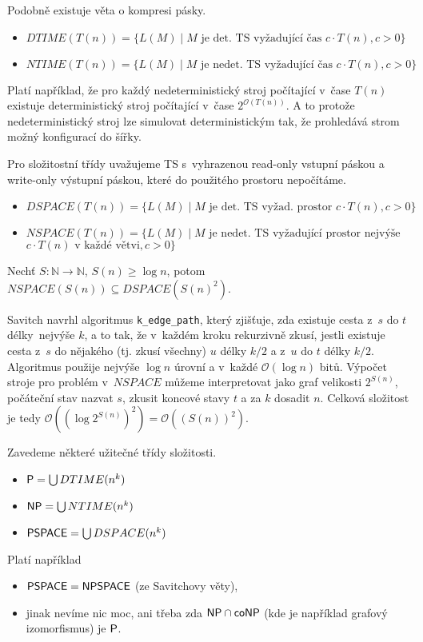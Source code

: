 Podobně existuje věta o kompresi pásky.

\begin{itemize}
    \item $DTIME(T(n)) = \{ L(M) \mid \text{$M$ je det. TS vyžadující
        čas $c \cdot T(n)$}, c > 0 \}$
    \item $NTIME(T(n)) = \{ L(M) \mid \text{$M$ je nedet. TS vyžadující
    čas } c \cdot T(n), c > 0 \}$
\end{itemize}

Platí například, že pro každý nedeterministický stroj počítající v~čase
$T(n)$ existuje deterministický stroj počítající v~čase
$2^{\mathcal{O}(T(n))}$. A to protože nedeterministický stroj lze
simulovat deterministickým tak, že prohledává strom možný konfigurací do
šířky.

Pro složitostní třídy uvažujeme TS s~vyhrazenou read-only vstupní páskou
a write-only výstupní páskou, které do použitého prostoru nepočítáme.

\begin{itemize}
    \item $DSPACE(T(n)) = \{ L(M) \mid \text{$M$ je det. TS vyžad.
        prostor } c \cdot T(n), c > 0 \}$
    \item $NSPACE(T(n)) = \{ L(M) \mid \text{$M$ je nedet. TS vyžadující
        prostor nejvýše}$ $c \cdot T(n) \text{ v~každé větvi}, c > 0 \}$
\end{itemize}

\begin{theorem}[Savitch]
    Nechť $S : \mathbb{N} \to \mathbb{N}$, $S(n) \geq \log n$,
    potom $NSPACE(S(n)) \subseteq DSPACE(S(n)^2)$.
\end{theorem}

Savitch navrhl algoritmus \verb|k_edge_path|,
který zjišťuje, zda existuje cesta z~$s$ do $t$ délky~nejvýše $k$, a to
tak, že v~každém kroku rekurzivně zkusí, jestli existuje cesta z~$s$ do
nějakého (tj. zkusí všechny) $u$ délky $k/2$ a z~$u$ do $t$ délky $k/2$.
Algoritmus použije nejvýše $\log n$ úrovní a v~každé
$\mathcal{O}(\log n)$ bitů.
Výpočet stroje pro problém v~$NSPACE$ můžeme interpretovat jako graf
velikosti $2^{S(n)}$, počáteční stav nazvat $s$, zkusit koncové stavy
$t$ a za $k$ dosadit $n$. Celková složitost je tedy
$\mathcal{O}((\log 2^{S(n)})^2) = \mathcal{O}((S(n))^2)$.

Zavedeme některé užitečné třídy složitosti.

\begin{itemize}
    \item $\P = \bigcup DTIME(n^k)$
    \item $\NP = \bigcup NTIME(n^k)$
    \item $\PSPACE = \bigcup DSPACE(n^k)$
\end{itemize}
Platí například
\begin{itemize}
    \item $\PSPACE = \NPSPACE$ (ze Savitchovy věty),
    \item jinak nevíme nic moc, ani třeba zda $\NP \cap \coNP$ (kde je
        například grafový izomorfismus) je $\P$.
\end{itemize}

